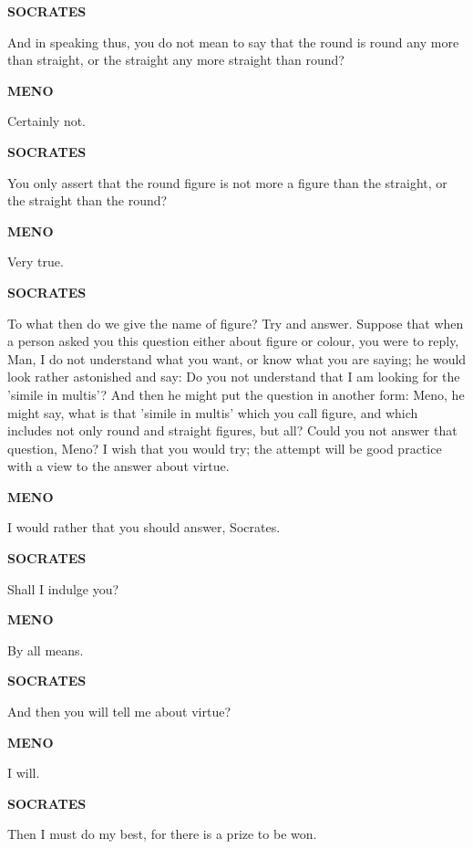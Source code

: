 \documentclass[11pt,letter]{article}
\begin{document}
\par \textbf{SOCRATES}
\par   And in speaking thus, you do not mean to say that the round is round any more than straight, or the straight any more straight than round?

\par \textbf{MENO}
\par   Certainly not.

\par \textbf{SOCRATES}
\par   You only assert that the round figure is not more a figure than the straight, or the straight than the round?

\par \textbf{MENO}
\par   Very true.

\par \textbf{SOCRATES}
\par   To what then do we give the name of figure? Try and answer. Suppose that when a person asked you this question either about figure or colour, you were to reply, Man, I do not understand what you want, or know what you are saying; he would look rather astonished and say:  Do you not understand that I am looking for the 'simile in multis'? And then he might put the question in another form:  Meno, he might say, what is that 'simile in multis' which you call figure, and which includes not only round and straight figures, but all? Could you not answer that question, Meno? I wish that you would try; the attempt will be good practice with a view to the answer about virtue.

\par \textbf{MENO}
\par   I would rather that you should answer, Socrates.

\par \textbf{SOCRATES}
\par   Shall I indulge you?

\par \textbf{MENO}
\par   By all means.

\par \textbf{SOCRATES}
\par   And then you will tell me about virtue?

\par \textbf{MENO}
\par   I will.

\par \textbf{SOCRATES}
\par   Then I must do my best, for there is a prize to be won.
\end{document}

